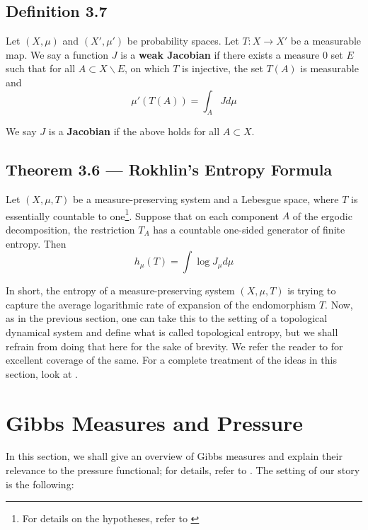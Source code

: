 \documentclass[11pt,a4paper]{article}
\begin{document}
\subsection*{Definition 3.7}
    Let $(X, \mu)$ and $(X', \mu')$ be probability spaces. Let $T:X\rightarrow X'$ be a measurable map. We say a function $J$ is a \textbf{weak Jacobian} if there exists a measure $0$ set $E$ such that for all $A \subset X\backslash E$, on which $T$ is injective, the set $T(A)$ is measurable and
    \[
    \mu'(T(A)) = \int_AJd\mu
    \]

    We say $J$ is a \textbf{Jacobian} if the above holds for all $A\subset X$.

\subsection*{Theorem 3.6 — Rokhlin's Entropy Formula} Let $(X, \mu, T)$ be a measure-preserving system and a Lebesgue space, where $T$ is essentially countable to one\footnote{For details on the hypotheses, refer to \cite{przytycki2010conformal}}. Suppose that on each component $A$ of the ergodic decomposition, the restriction $T_A$ has a countable one-sided generator of finite entropy. Then
$$h_{\mu}(T) = \int \log{J_{\mu}}d\mu$$


In short, the entropy of a measure-preserving system $(X,\mu,T)$ is trying to
capture the average logarithmic rate of expansion of the endomorphism $T$.
Now, as in the previous section, one can take this to the setting of a
topological dynamical system and define what is called topological entropy,
but we shall refrain from doing that here for the sake of brevity. We refer
the reader to \cite{viana2016foundations} for excellent coverage of the same.
For a complete treatment of the ideas in this section, look at
\cite{przytycki2010conformal}.

\section{Gibbs Measures and Pressure}
In this section, we shall give an overview of Gibbs measures and explain their
relevance to the pressure functional; for details, refer to
\cite{przytycki2010conformal}. The setting of our story is the following:
\end{document}
